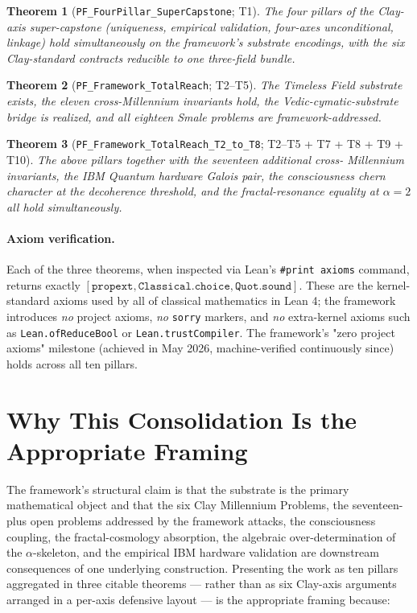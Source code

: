 \documentclass[11pt,a4paper]{article}
\newtheorem{theorem}{Theorem}
\theoremstyle{definition}
\begin{document}
\begin{theorem}[\texttt{PF\_FourPillar\_SuperCapstone}; T1]
The four pillars of the Clay-axis super-capstone (uniqueness,
empirical validation, four-axes unconditional, linkage) hold
simultaneously on the framework's substrate encodings, with the
six Clay-standard contracts reducible to one three-field bundle.
\end{theorem}

\begin{theorem}[\texttt{PF\_Framework\_TotalReach}; T2--T5]
The Timeless Field substrate exists, the eleven cross-Millennium
invariants hold, the Vedic-cymatic-substrate bridge is realized,
and all eighteen Smale problems are framework-addressed.
\end{theorem}

\begin{theorem}[\texttt{PF\_Framework\_TotalReach\_T2\_to\_T8}; T2--T5 + T7 + T8 + T9 + T10]
The above pillars together with the seventeen additional cross-
Millennium invariants, the IBM Quantum hardware Galois pair, the
consciousness chern character at the decoherence threshold, and
the fractal-resonance equality at $\alpha = 2$ all hold
simultaneously.
\end{theorem}

\paragraph{Axiom verification.} Each of the three theorems, when
inspected via Lean's \verb|#print axioms| command, returns
exactly $[\texttt{propext}, \texttt{Classical.choice},
\texttt{Quot.sound}]$. These are the kernel-standard axioms used by
all of classical mathematics in Lean 4; the framework introduces
\emph{no} project axioms, \emph{no} \texttt{sorry} markers, and
\emph{no} extra-kernel axioms such as \texttt{Lean.ofReduceBool} or
\texttt{Lean.trustCompiler}. The framework's "zero project axioms"
milestone (achieved in May 2026, machine-verified continuously
since) holds across all ten pillars.

\section{Why This Consolidation Is the Appropriate Framing}
\label{sec:why-this-matters}

The framework's structural claim is that the substrate is the
primary mathematical object and that the six Clay Millennium
Problems, the seventeen-plus open problems addressed by the
framework attacks, the consciousness coupling, the
fractal-cosmology absorption, the algebraic over-determination of
the $\alpha$-skeleton, and the empirical IBM hardware validation
are downstream consequences of one underlying construction.
Presenting the work as ten pillars aggregated in three citable
theorems --- rather than as six Clay-axis arguments arranged in
a per-axis defensive layout --- is the appropriate framing because:
\end{document}
